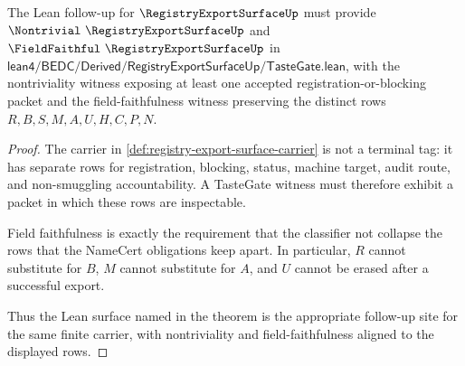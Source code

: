 \begin{theorem}
\label{thm:registry-export-surface-tastegate-obligation}
The Lean follow-up for $\RegistryExportSurfaceUp$ must provide $\Nontrivial\ \RegistryExportSurfaceUp$ and $\FieldFaithful\ \RegistryExportSurfaceUp$ in $\mathsf{lean4/BEDC/Derived/RegistryExportSurfaceUp/TasteGate.lean}$, with the nontriviality witness exposing at least one accepted registration-or-blocking packet and the field-faithfulness witness preserving the distinct rows $R,B,S,M,A,U,H,C,P,N$.
\end{theorem}
\begin{proof}
The carrier in \autoref{def:registry-export-surface-carrier} is not a terminal tag: it has separate rows for registration, blocking, status, machine target, audit route, and non-smuggling accountability. A TasteGate witness must therefore exhibit a packet in which these rows are inspectable.

Field faithfulness is exactly the requirement that the classifier not collapse the rows that the NameCert obligations keep apart. In particular, $R$ cannot substitute for $B$, $M$ cannot substitute for $A$, and $U$ cannot be erased after a successful export.

Thus the Lean surface named in the theorem is the appropriate follow-up site for the same finite carrier, with nontriviality and field-faithfulness aligned to the displayed rows.
\end{proof}



